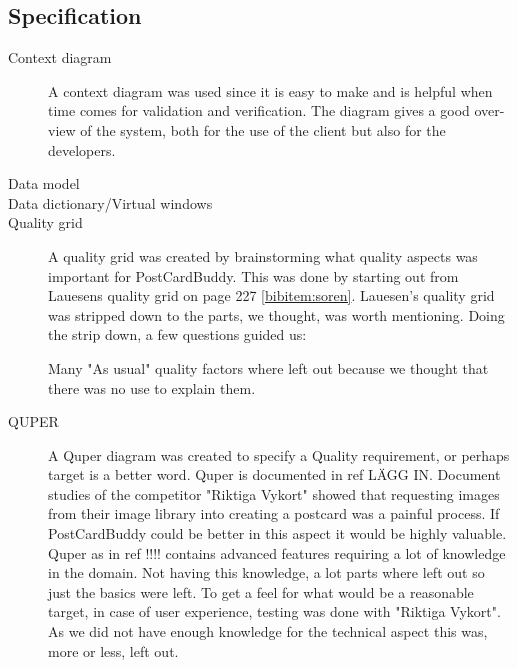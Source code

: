 \documentclass[10pt,a4paper]{article}
\begin{document}
\subsection{Specification}

\begin{description}
\item[Context diagram] A context diagram was used since it is easy to make and is helpful when time comes for validation and verification. The diagram gives a good over-view of the system, both for the use of the client but also for the developers. 

\item[Data model]

\item[Data dictionary/Virtual windows]

\item[Quality grid]
A quality grid was created by brainstorming what quality aspects was important for PostCardBuddy. This was done by starting out from Lauesens quality grid on page 227 \ref{bibitem:soren}. Lauesen's quality grid was stripped down to the parts, we thought, was worth mentioning. Doing the strip down, a few questions guided us:

Many "As usual" quality factors where left out because we thought that there was no use to explain them.

\item[QUPER]
A Quper diagram was created to specify a Quality requirement, or perhaps target is a better word. Quper is documented in ref LÄGG IN. Document studies of the competitor "Riktiga Vykort" showed that requesting images from their image library into creating a postcard was a painful process. If PostCardBuddy could be better in this aspect it would be highly valuable. Quper as in ref !!!! contains advanced features requiring a lot of knowledge in the domain. Not having this knowledge, a lot parts where left out so just the basics were left. To get a feel for what would be a reasonable target, in case of user experience, testing was done with "Riktiga Vykort". As we did not have enough knowledge for the technical aspect this was, more or less, left out.

\end{description}
\end{document}
